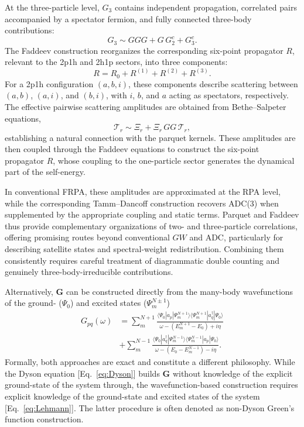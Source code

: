 \documentclass[aip,jcp,reprint,noshowkeys,superscriptaddress]{revtex4-2}
\newcommand{\bG}{\boldsymbol{G}}
\begin{document}
At the three-particle level, $G_3$ contains independent propagation,
correlated pairs accompanied by a spectator fermion, and fully
connected three-body contributions:
\begin{equation}
  G_3 \sim GGG + G\,G_2^c + G_3^c.
\end{equation}
The Faddeev construction reorganizes the corresponding six-point
propagator $R$, relevant to the 2p1h and 2h1p sectors, into
three components:
\begin{equation}
  R = R_0 + R^{(1)} + R^{(2)} + R^{(3)}.
\end{equation}
For a 2p1h configuration $(a,b,i)$, these components describe
scattering between $(a,b)$, $(a,i)$, and $(b,i)$, with $i$, $b$,
and $a$ acting as spectators, respectively. The effective pairwise
scattering amplitudes are obtained from Bethe--Salpeter equations,
\begin{equation}
  \mathcal{T}_r \sim \Xi_r + \Xi_r\,GG\,\mathcal{T}_r,
\end{equation}
establishing a natural connection with the parquet kernels.
These amplitudes are then coupled through the Faddeev equations
to construct the six-point propagator $R$, whose coupling to
the one-particle sector generates the dynamical part of the
self-energy.

In conventional FRPA, these amplitudes are approximated at the RPA level, 
while the corresponding Tamm–Dancoff construction recovers ADC(3) when 
supplemented by the appropriate coupling and static terms.
Parquet and Faddeev thus provide complementary
organizations of two- and three-particle correlations, offering
promising routes beyond conventional $GW$ and ADC, particularly
for describing satellite states and spectral-weight redistribution.
Combining them consistently requires careful treatment of
diagrammatic double counting and genuinely three-body-irreducible
contributions.

\fi

\iffalse
Alternatively, $\bG$ can be constructed directly from the many-body wavefunctions of the ground- ($\Psi_0$) and excited states ($\Psi_m^{N\pm1}$)
\begin{align}
    G_{pq}(\omega) &= \sum_{m}^{N+1} \frac{\langle \Psi_0 | a_p | \Psi_m^{N+1} \rangle \langle \Psi_m^{N+1} | a_q^\dagger | \Psi_0 \rangle}{\omega - (E_m^{N+1} - E_0) + i\eta} \nonumber \\
    &+ \sum_{m}^{N-1} \frac{\langle \Psi_0 | a_q^\dagger | \Psi_m^{N-1} \rangle \langle \Psi_m^{N-1} | a_p | \Psi_0 \rangle}{\omega - (E_0 - E_m^{N-1}) - i\eta}.
    \label{eq:Lehmann}
\end{align}
Formally, both approaches are exact and constitute a different philosophy. 
While the Dyson equation [Eq.~\eqref{eq:Dyson}] builds $\bG$ without knowledge of the explicit ground-state of the system through, the wavefunction-based construction requires explicit knowledge of the ground-state and excited states of the system [Eq.~\eqref{eq:Lehmann}].
The latter procedure is often denoted as non-Dyson Green's function construction.
\end{document}
